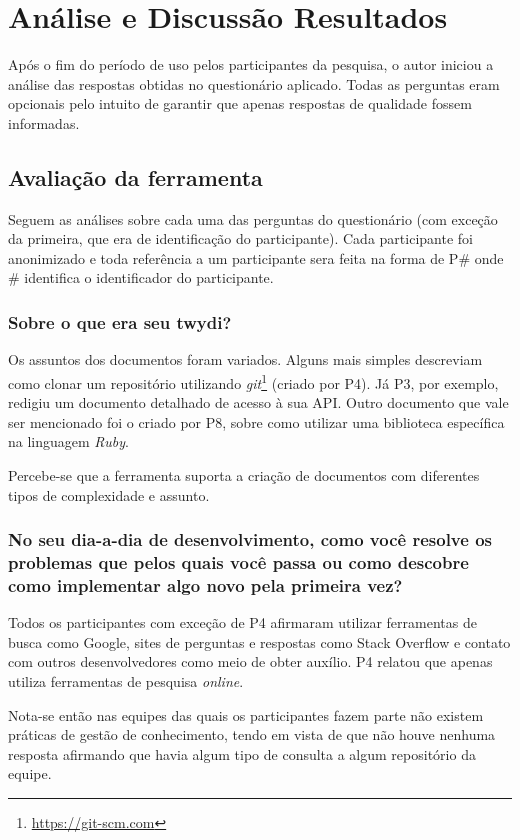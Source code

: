 \chapter{Análise e Discussão Resultados}

Após o fim do período de uso pelos participantes da pesquisa, o autor iniciou a análise das respostas obtidas no questionário aplicado. Todas as perguntas eram opcionais pelo intuito de garantir que apenas respostas de qualidade fossem informadas.

\section{Avaliação da ferramenta}

Seguem as análises sobre cada uma das perguntas do questionário (com exceção da primeira, que era de identificação do participante). Cada participante foi anonimizado e toda referência a um participante sera feita na forma de P# onde # identifica o identificador do participante.

\subsection{Sobre o que era seu twydi?}

Os assuntos dos documentos foram variados. Alguns mais simples descreviam como clonar um repositório utilizando \textit{git}\footnote{\url{https://git-scm.com}} (criado por P4). Já P3, por exemplo, redigiu um documento detalhado de acesso à sua API. Outro documento que vale ser mencionado foi o criado por P8, sobre como utilizar uma biblioteca específica na linguagem \textit{Ruby}.

Percebe-se que a ferramenta suporta a criação de documentos com diferentes tipos de complexidade e assunto.

\subsection{No seu dia-a-dia de desenvolvimento, como você resolve os problemas que pelos quais você passa ou como descobre como implementar algo novo pela primeira vez?}

Todos os participantes com exceção de P4 afirmaram utilizar ferramentas de busca como Google, sites de perguntas e respostas como Stack Overflow e contato com outros desenvolvedores como meio de obter auxílio. P4 relatou que apenas utiliza ferramentas de pesquisa \textit{online}.

Nota-se então nas equipes das quais os participantes fazem parte não existem práticas de gestão de conhecimento, tendo em vista de que não houve nenhuma resposta afirmando que havia algum tipo de consulta a algum repositório da equipe.


